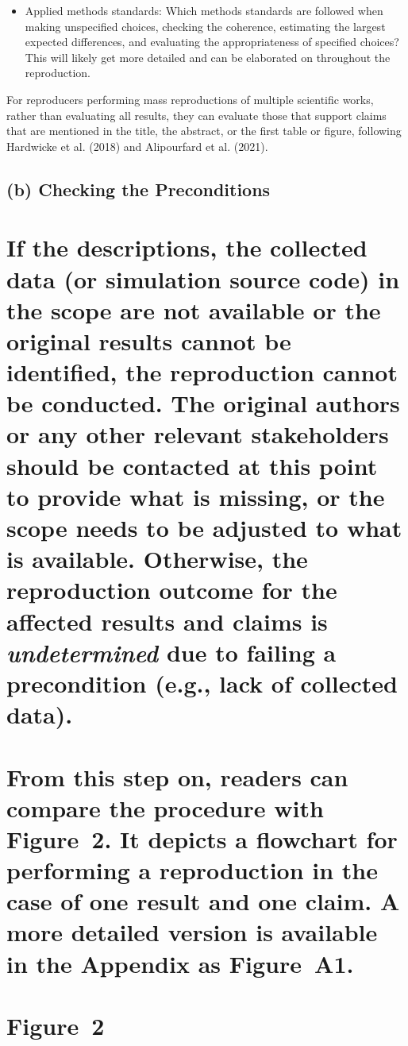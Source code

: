 \documentclass[authordate, empirical]{jote-new-article}
\begin{document}
\begin{itemize}
		\item Applied methods standards: Which methods standards are followed when making unspecified choices, checking the coherence, estimating the largest expected differences, and evaluating the appropriateness of specified choices? This will likely get more detailed and can be elaborated on throughout the reproduction.


	\end{itemize}

	For reproducers performing mass reproductions of multiple scientific works, rather than evaluating all results, they can evaluate those that support claims that are mentioned in the title, the abstract, or the first table or figure, following Hardwicke et al. (2018) and Alipourfard et al. (2021).



	\subsection{(b) Checking the Preconditions}



	\section{If the descriptions, the collected data (or simulation source code) in the scope are not available or the original results cannot be identified, the reproduction cannot be conducted. The original authors or any other relevant stakeholders should be contacted at this point to provide what is missing, or the scope needs to be adjusted to what is available. Otherwise, the reproduction outcome for the affected results and claims is \emph{undetermined} due to failing a precondition (e.g., lack of collected data).}



	\section{From this step on, readers can compare the procedure with Figure 2. It depicts a flowchart for performing a reproduction in the case of one result and one claim. A more detailed version is available in the Appendix as Figure A1.}



	\section{\textbf{Figure 2}}
\end{document}
